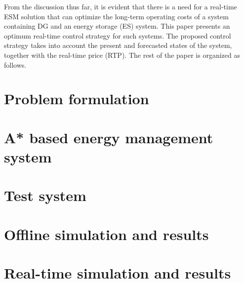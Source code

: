 From the discussion thus far, it is evident that there is a need for a real-time ESM solution that can optimize the long-term operating costs of a system containing DG and an energy storage (ES) system. This paper presents an optimum real-time control strategy for such systems. The proposed control strategy takes into account the present and forecasted states of the system, together with the real-time price (RTP). The rest of the paper is organized as follows.



\section{Problem formulation} \label{formulation}


\section{A* based energy management system} \label{A*}


\section{Test system} \label{sys}


\section{Offline simulation and results} \label{OFF}


\section{Real-time simulation and results} \label{RT}
